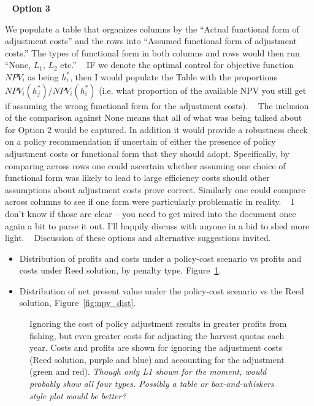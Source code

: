 \documentclass[authoryear, review, 12pt]{elsarticle}
\newcommand{\cdb}[1]{{\it \color{darkgreen} #1}}
\begin{document}
{   
  \textbf{Option 3}


  We populate a table that organizes columns by the ``Actual functional form of adjustment costs'' and the rows into ``Assumed functional form of adjustment costs.'' The types of functional form in both columns and rows would then run ``None, $L_1$, $L_2$ etc.''
   
  IF we denote the optimal control for objective function $NPV_i$ as being $h^*_i$, then I would populate the Table with the proportions
  $NPV_i(h^*_j) / NPV_i(h^*_i)$
  (i.e. what proportion of the available NPV you still get if assuming the wrong functional form for the adjustment costs).
   
  The inclusion of the comparison against None means that all of what was being talked about for Option 2 would be captured. In addition it would provide a robustness check on a policy recommendation if uncertain of either the presence of policy adjustment costs or functional form that they should adopt. Specifically, by comparing across rows one could ascertain whether assuming one choice of functional form was likely to lead to large efficiency costs should other assumptions about adjustment costs prove correct. Similarly one could compare across columns to see if one form were particularly problematic in reality.
   
  I don’t know if those are clear – you need to get mired into the document once again a bit to parse it out. I’ll happily discuss with anyone in a bid to shed more light.
   
  Discussion of these options and alternative suggestions invited.
}



\begin{itemize}
  \item Distribution of profits and costs under a policy-cost scenario vs profits and costs under Reed solution, by penalty type. Figure~\ref{fig:profits_costs}.
  \item Distribution of net present value under the policy-cost scenario vs the Reed solution, Figure~\ref{fig:npv_dist}.  
\end{itemize}

\begin{figure}
  \begin{center}
    \caption{Ignoring the cost of policy adjustment results in greater profits from fishing, but even greater costs for adjusting the harvest quotas each year.  Costs and profits are shown for ignoring the adjustment costs (Reed solution, purple and blue) and accounting for the adjustment (green and red).  \cdb{Though only L1 shown for the moment, would probably show all four types.  Possibly a table or box-and-whiskers style plot would be better?}}\label{fig:profits_costs}
  \end{center}
\end{figure}
\end{document}
